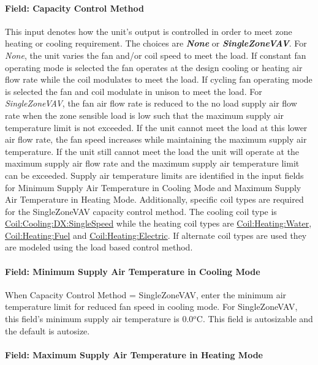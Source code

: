 \paragraph{Field: Capacity Control Method}\label{field-capacity-control-method-2}

This input denotes how the unit's output is controlled in order to meet zone heating or cooling requirement. The choices are \textbf{\emph{None}} or \textbf{\emph{SingleZoneVAV}}. For \emph{None}, the unit varies the fan and/or coil speed to meet the load. If constant fan operating mode is selected the fan operates at the design cooling or heating air flow rate while the coil modulates to meet the load. If cycling fan operating mode is selected the fan and coil modulate in unison to meet the load. For \emph{SingleZoneVAV}, the fan air flow rate is reduced to the no load supply air flow rate when the zone sensible load is low such that the maximum supply air temperature limit is not exceeded. If the unit cannot meet the load at this lower air flow rate, the fan speed increases while maintaining the maximum supply air temperature. If the unit still cannot meet the load the unit will operate at the maximum supply air flow rate and the maximum supply air temperature limit can be exceeded. Supply air temperature limits are identified in the input fields for Minimum Supply Air Temperature in Cooling Mode and Maximum Supply Air Temperature in Heating Mode. Additionally, specific coil types are required for the SingleZoneVAV capacity control method. The cooling coil type is \hyperref[coilcoolingdxsinglespeed]{Coil:Cooling:DX:SingleSpeed} while the heating coil types are \hyperref[coilheatingwater]{Coil:Heating:Water}, \hyperref[coilheatinggas-000]{Coil:Heating:Fuel} and \hyperref[coilheatingelectric]{Coil:Heating:Electric}. If alternate coil types are used they are modeled using the load based control method.

\paragraph{Field: Minimum Supply Air Temperature in Cooling Mode}\label{field-minimum-supply-air-temperature-in-cooling-mode-2}

When Capacity Control Method = SingleZoneVAV, enter the minimum air temperature limit for reduced fan speed in cooling mode. For SingleZoneVAV, this field's minimum supply air temperature is 0.0\(^{o}\)C. This field is autosizable and the default is autosize.

\paragraph{Field: Maximum Supply Air Temperature in Heating Mode}\label{field-maximum-supply-air-temperature-in-heating-mode-2}

